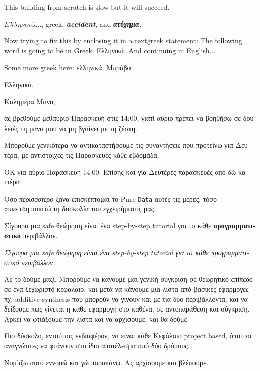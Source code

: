 \documentclass[fontsize=10pt, twoside=false, numbers=noenddot]{kaobook}
\begin{document}
This building from scratch is slow but it will succeed.

\(Ελληνικά ...\), greek. \textbf{\textit{accident}}, and \textbf{\textit{ατύχημα.}}

Now trying to fix this by enclosing it in a textgreek statement:
The following word is going to be in Greek: \textgreek{Ελληνικά}. And continuing in English...

Some more greek here: \textgreek{ελληνικά.  Μπράβο.}

\begin{greek}
  Ελληνικά.

  Καλημέρα Μάνο,

    ας βρεθούμε μεθαύριο \textsf{Παρασκευή} στις 14:00, γιατί αύριο πρέπει να βοηθήσω σε δουλειές τη μάνα μου να μη βγαίνει με τη ζέστη.

    Μπορούμε γενικότερα να αντικαταστήσουμε τις συναντήσεις που προτείνω για Δευτέρα, με αντίστοιχες τις Παρασκευές κάθε εβδομάδα.


ΟΚ για αύριο Παρασκευή 14:00.
Επίσης και για Δευτέρες-παρασκευές από δώ κα ιπέρα

    Όσο \textit{περισσότερο} ξανα-επισκέπτομαι το Pure \texttt{Data} αυτές τις μέρες, τόσο \texttt{συνειδητοποιώ} τη δυσκολία του εγχειρήματος μας.

    Σίγουρα μια safe θεώρηση είναι ένα step-by-step tutorial για το κάθε \textbf{προγραμματιστικό} περιβάλλον.

\textit{Σίγουρα μια safe θεώρηση είναι ένα step-by-step tutorial για το κάθε προγραμματιστικό περιβάλλον.}


Ας το δούμε μαζί. Μπορούμε να κάνουμε μαι γενική σύγκριση σε θεωρητικό επίπεδο σε ένα ξεχωριστό κεφαλαιο,
και μετά να κάνουμε μια λίστα από βασικές εφαρμογες πχ. additive synthesis που μπορούν να γίνουν και με τια
δυο περιβάλλοντα, και να δείξουμε πως γίνεται η καθε εφαρμογή στο καθένα, σε αντοπαράθεση και σύγκριση.
Αρκει να φτιάξουμε την λίστα και να αρχίσουμε, και θα δούμε.

    Πιο δύσκολο, εντούτοις ενδιαφέρον, να είναι κάθε Κεφάλαιο project based, όπου οι αναγνώστες να φτάνουν στο ίδιο αποτέλεσμα από δύο δρόμους.


Νομ'ιζω αυτό εννοοώ και γώ παραπάνω. Ας αρχίσουμε και βλέπουμε.
\end{greek}
\end{document}
